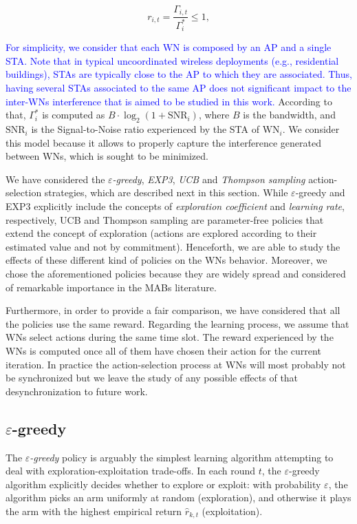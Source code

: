 \documentclass[10pt,journal,compsoc]{IEEEtran}
\newcommand{\francesc}[1]{\textcolor{blue}{#1}}
\begin{document}
	\begin{equation}
	r_{i,t} = {\frac{\Gamma_{i,t}}{{\Gamma_{i}^*}}} \leq 1,
	\label{eq:reward_generation}
	\nonumber
	\end{equation}
	
	\francesc{For simplicity, we consider that each WN is composed by an AP and a single STA. Note that in typical uncoordinated wireless deployments (e.g., residential buildings), STAs are typically close to the AP to which they are associated. Thus, having several STAs associated to the same AP does not significant impact to the inter-WNs interference that is aimed to be studied in this work.} According to that, $\Gamma_{i}^*$ is computed as $B \cdot \log_{2}(1 + \text{SNR}_{i})$, where $B$ is the bandwidth, and $\text{SNR}_{i}$ is the Signal-to-Noise ratio experienced by the STA of $\text{WN}_i$. We consider this model because it allows to properly capture the interference generated between WNs, which is sought to be minimized.
	
	We have considered the \emph{$\varepsilon$-greedy}, \emph{EXP3}, \emph{UCB} and \emph{Thompson sampling} action-selection strategies, which are described next in this section. While $\varepsilon$-greedy and EXP3 explicitly include the concepts of \emph{exploration coefficient} and \emph{learning rate}, respectively, UCB and Thompson sampling are parameter-free policies that extend the concept of exploration (actions are explored according to their estimated value and not by commitment). Henceforth, we are able to study the effects of these different kind of policies on the WNs behavior. Moreover, we chose the aforementioned policies because they are widely spread and considered of remarkable importance in the MABs literature.
	
	Furthermore, in order to provide a fair comparison, we have considered that all the policies use the same reward. Regarding the learning process, we assume that WNs select actions during the same time slot. The reward experienced by the WNs is computed once all of them have chosen their action for the current iteration. In practice the action-selection process at WNs will most probably not be synchronized but we leave the study of any possible effects of that desynchronization to future work.
	
	\subsection{$\varepsilon$-greedy}
	\label{section:bandits_egreedy}	
	The \emph{$\varepsilon$-greedy} policy \cite{sutton1998reinforcement,auer2002finite} is arguably the simplest learning algorithm attempting to deal with exploration-exploitation trade-offs. In each round $t$, the $\varepsilon$-greedy algorithm explicitly decides whether to explore or exploit: with probability $\varepsilon$, the algorithm picks an arm uniformly at random (exploration), and otherwise it plays the arm with the highest empirical return $\hat{r}_{k,t}$ (exploitation). 
	
\end{document}

